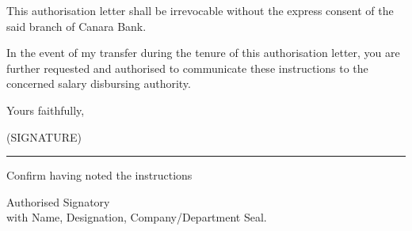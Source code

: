 \documentclass[11pt]{article}
\begin{document}
	\vspace{0.5cm}
	
	\noindent
	This authorisation letter shall be irrevocable without the express consent of the said branch of Canara Bank.
	
	\vspace{0.5cm}
	
	\noindent
	In the event of my transfer during the tenure of this authorisation letter, you are further requested and authorised to communicate these instructions to the concerned salary disbursing authority.
	
	\vspace{0.8cm}
	
	\noindent
	Yours faithfully,
	
	\vspace{2cm}
	
	\noindent
	\begin{minipage}[t]{0.4\textwidth}
	(SIGNATURE)
	
	\vspace{0.5cm}
	
	\hrule
	
	\vspace{0.2cm}
	
	\noindent
	Confirm having noted the instructions
	\end{minipage}
	\vspace{2cm}
	
	\noindent
	Authorised Signatory\\
	with Name, Designation, Company/Department Seal.
	
\end{document}
